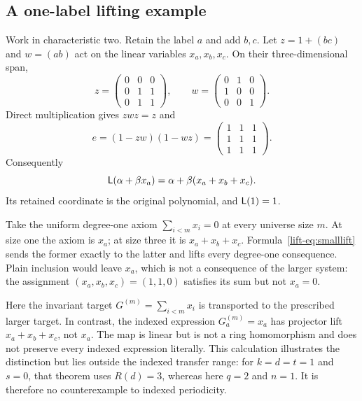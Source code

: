 \documentclass[11pt,a4paper]{article}
\theoremstyle{definition}\newtheorem{definition}[theorem]{Definition}
\theoremstyle{remark}\newtheorem{remark}[theorem]{Remark}
\begin{document}
\subsection{A one-label lifting example}\label{lift-sec:small}
Work in characteristic two. Retain the label $a$ and add $b,c$.
Let $z=1+(bc)$ and $w=(ab)$ act on the linear variables
$x_a,x_b,x_c$. On their three-dimensional span,
\[
 z=\begin{pmatrix}0&0&0\\0&1&1\\0&1&1\end{pmatrix},\qquad
 w=\begin{pmatrix}0&1&0\\1&0&0\\0&0&1\end{pmatrix}.
\]
Direct multiplication gives $zwz=z$ and
\[
                       e=(1-zw)(1-wz)
                         =\begin{pmatrix}1&1&1\\1&1&1\\1&1&1\end{pmatrix}.
\]
Consequently
\begin{equation}\label{lift-eq:smalllift}
                  \mathsf L(\alpha+\beta x_a)
                      =\alpha+\beta(x_a+x_b+x_c).
\end{equation}
Its retained coordinate is the original polynomial, and $\mathsf L(1)=1$.

Take the uniform degree-one axiom $\sum_{i<m}x_i=0$ at every universe size $m$.
At size one the axiom is $x_a$; at size three it is $x_a+x_b+x_c$.
Formula~\eqref{lift-eq:smalllift} sends the former exactly to the latter and
lifts every degree-one consequence. Plain inclusion would leave $x_a$,
which is not a consequence of the larger system: the assignment
$(x_a,x_b,x_c)=(1,1,0)$ satisfies its sum but not $x_a=0$.

Here the invariant target $G^{(m)}=\sum_{i<m}x_i$ is transported to
the prescribed larger target. In contrast, the indexed expression
$G_a^{(m)}=x_a$ has projector lift $x_a+x_b+x_c$, not $x_a$. The map
is linear but is not a ring homomorphism and does not preserve every
indexed expression literally. This calculation illustrates the distinction but lies outside the
indexed transfer range: for $k=d=t=1$ and $s=0$, that theorem uses
$R(d)=3$, whereas here $q=2$ and $n=1$. It is therefore no
counterexample to indexed periodicity.
\end{document}

